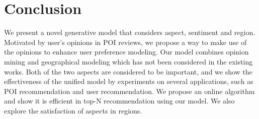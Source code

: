 \section{Conclusion}
\label{sec:conclude}
We present a novel generative model that considers aspect,
sentiment and region. Motivated by user's opinions in
POI reviews, we propose a way to make use of the opinions
to enhance user preference modeling. Our model combines
opinion mining and geographical modeling which has not been
considered in the existing works. Both of the two
aspects are considered to be important, and we show the
effectiveness of the unified model by experiments on
several applications, such as POI recommendation and
user recommendation. We propose an online algorithm
and show it is efficient in top-N recommendation using our model. 
We also explore the satisfaction of 
aspects in regions.
